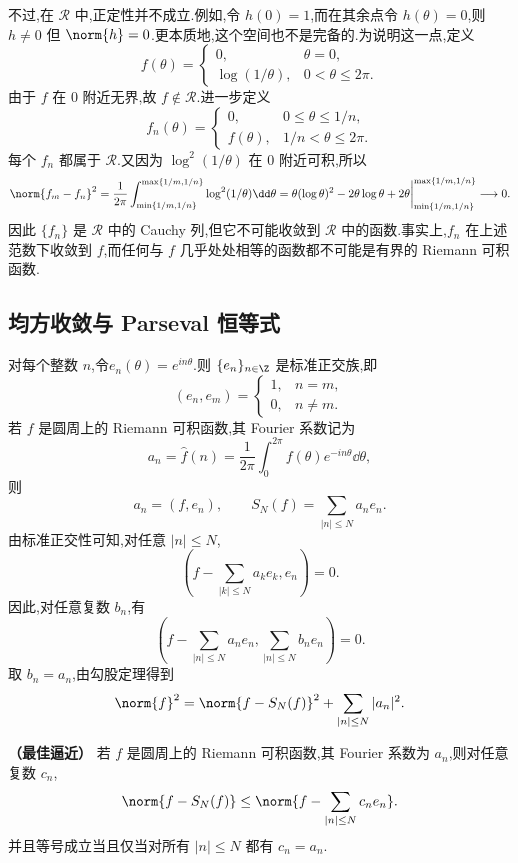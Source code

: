 不过,在 $\mathcal R$ 中,正定性并不成立.例如,令 $h(0)=1$,而在其余点令 $h(\theta)=0$,则 $h\neq0$ 但 $\norm{h}=0$.更本质地,这个空间也不是完备的.为说明这一点,定义
\[
f(\theta)=
\begin{cases}
	0,&\theta=0,\\
	\log(1/\theta),&0<\theta\leq2\pi.
\end{cases}
\]
由于 $f$ 在 $0$ 附近无界,故 $f\notin\mathcal R$.进一步定义
\[
f_n(\theta)=
\begin{cases}
	0,&0\leq\theta\leq 1/n,\\
	f(\theta),&1/n<\theta\leq2\pi.
\end{cases}
\]
每个 $f_n$ 都属于 $\mathcal R$.又因为 $\log^2(1/\theta)$ 在 $0$ 附近可积,所以
\[
\norm{f_m-f_n}^2
=\frac1{2\pi}\int_{\min\{1/m,1/n\}}^{\max\{1/m,1/n\}}
\log^2(1/\theta)\dd\theta=\theta(\log\theta)^2-2\theta\log\theta+2\theta\bigg|_{\min\{1/m,1/n\}}^{\max\{1/m,1/n\}}\longrightarrow0.
\]
因此 $\{f_n\}$ 是 $\mathcal R$ 中的 Cauchy 列,但它不可能收敛到 $\mathcal R$ 中的函数.事实上,$f_n$ 在上述范数下收敛到 $f$,而任何与 $f$ 几乎处处相等的函数都不可能是有界的 Riemann 可积函数.

\subsection*{均方收敛与 Parseval 恒等式}

对每个整数 $n$,令$e_n(\theta)=e^{in\theta}.$则 $\{e_n\}_{n\in\Z}$ 是标准正交族,即
\[
(e_n,e_m)=
\begin{cases}
	1,&n=m,\\
	0,&n\neq m.
\end{cases}
\]
若 $f$ 是圆周上的 Riemann 可积函数,其 Fourier 系数记为
\[
a_n=\widehat f(n)=\frac1{2\pi}\int_0^{2\pi}f(\theta)e^{-in\theta}\dd\theta,
\]
则
\[
a_n=(f,e_n),
\qquad
S_N(f)=\sum_{|n|\leq N}a_ne_n.
\]
由标准正交性可知,对任意 $|n|\leq N$,
\[
\left(f-\sum_{|k|\leq N}a_ke_k,e_n\right)=0.
\]
因此,对任意复数 $b_n$,有
\begin{equation}\label{eq:orthogonal-decomposition}
	\left(f-\sum_{|n|\leq N}a_ne_n,\sum_{|n|\leq N}b_ne_n\right)=0.
\end{equation}
取 $b_n=a_n$,由勾股定理得到
\begin{equation}\label{eq:finite-parseval}
	\norm{f}^2
	=\norm{f-S_N(f)}^2+
	\sum_{|n|\leq N}|a_n|^2.
\end{equation}

\begin{lemma}
	\textbf{（最佳逼近）}
	若 $f$ 是圆周上的 Riemann 可积函数,其 Fourier 系数为 $a_n$,则对任意复数 $c_n$,
	\[
	\norm{f-S_N(f)}
	\leq
	\norm{f-\sum_{|n|\leq N}c_ne_n}.
	\]
	并且等号成立当且仅当对所有 $|n|\leq N$ 都有 $c_n=a_n$.
\end{lemma}

